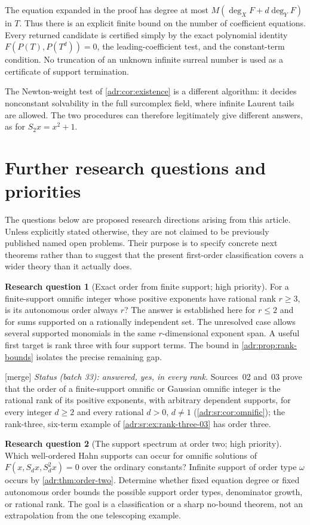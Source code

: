 \documentclass[11pt,letterpaper]{article}
\numberwithin{equation}{section}
\theoremstyle{definition}
\newtheorem{question}{Research question}
\theoremstyle{remark}
\newcommand{\mtag}{\textup{[merge]}}%
\begin{document}
The equation expanded in the proof has degree at most
$M(\deg_XF+d\deg_YF)$ in $T$. Thus there is an explicit finite bound on
the number of coefficient equations. Every returned candidate is
certified simply by the exact polynomial identity
$F(P(T),P(T^d))=0$, the leading-coefficient test, and the constant-term
condition. No truncation of an unknown infinite surreal number is used
as a certificate of support termination.

The Newton-weight test of \cref{adr:cor:existence} is a different algorithm:
it decides nonconstant solvability in the full surcomplex field, where
infinite Laurent tails are allowed. The two procedures can therefore
legitimately give different answers, as for $S_2x=x^2+1$.

\section{Further research questions and priorities}\label{adr:sec:questions}

The questions below are proposed research directions arising from this
article. Unless explicitly stated otherwise, they are not claimed to be
previously published named open problems. Their purpose is to specify
concrete next theorems rather than to suggest that the present first-order
classification covers a wider theory than it actually does.

\begin{question}[Exact order from finite support; high priority]
For a finite-support omnific integer whose positive exponents have rational
rank $r\ge3$, is its autonomous order always $r$? The answer is established
here for $r\le2$ and for sums supported on a rationally independent set.
The unresolved case allows several supported monomials in the same
$r$-dimensional exponent span. A useful first target is rank three with
four support terms. The bound in \cref{adr:prop:rank-bounds} isolates the
precise remaining gap.
\end{question}

\mtag{} \emph{Status (batch 33): answered, yes, in every rank.} Sources~02
and~03 prove that the order of a finite-support omnific or Gaussian omnific
integer is the rational rank of its positive exponents, with arbitrary
dependent supports, for every integer $d\ge2$ and every rational $d>0$,
$d\ne1$ (\cref{adr:sr:cor:omnific}); the rank-three, six-term example of
\cref{adr:sr:ex:rank-three-03} has order three.

\begin{question}[The support spectrum at order two; high priority]
Which well-ordered Hahn supports can occur for omnific solutions of
$F(x,S_dx,S_d^2x)=0$ over the ordinary constants? Infinite support of
order type $\omega$ occurs by \cref{adr:thm:order-two}. Determine whether
fixed equation degree or fixed autonomous order bounds the possible
support order types, denominator growth, or rational rank. The goal is
a classification or a sharp no-bound theorem, not an extrapolation from
the one telescoping example.
\end{question}
\end{document}

